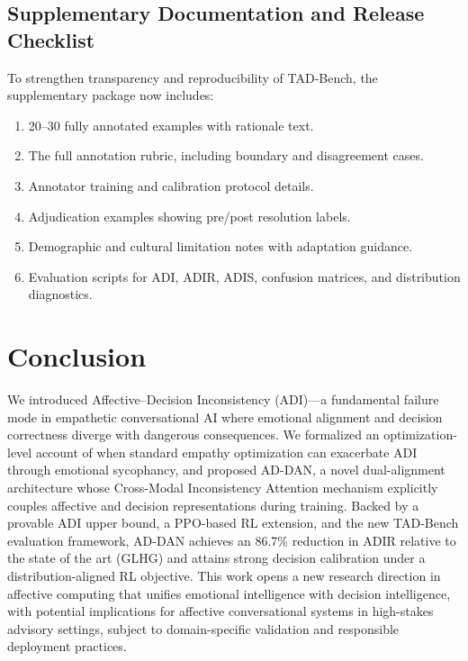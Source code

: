 \documentclass[lettersize,journal]{IEEEtran}
\begin{document}
\subsection{Supplementary Documentation and Release Checklist}
\label{sec:supplementary_checklist}

To strengthen transparency and reproducibility of TAD-Bench, the
supplementary package now includes:
\begin{enumerate}
\item 20--30 fully annotated examples with rationale text.
\item The full annotation rubric, including boundary and disagreement cases.
\item Annotator training and calibration protocol details.
\item Adjudication examples showing pre/post resolution labels.
\item Demographic and cultural limitation notes with adaptation guidance.
\item Evaluation scripts for ADI, ADIR, ADIS, confusion matrices, and
distribution diagnostics.
\end{enumerate}

\section{Conclusion}
\label{sec:conclusion}

We introduced Affective--Decision Inconsistency (ADI)—a fundamental failure
mode in empathetic conversational AI where emotional alignment and decision
correctness diverge with dangerous consequences.  We formalized an
optimization-level account of when standard empathy optimization can
exacerbate ADI through emotional sycophancy, and proposed AD-DAN, a novel
dual-alignment architecture whose
Cross-Modal Inconsistency Attention mechanism explicitly couples affective
and decision representations during training.  Backed by a provable ADI upper
bound, a PPO-based RL extension, and the new TAD-Bench evaluation framework,
AD-DAN achieves an 86.7\% reduction in ADIR relative to the state of the art
(GLHG) and attains strong decision calibration under a distribution-aligned
RL objective.  This work
opens a new research direction in affective computing that unifies emotional
intelligence with decision intelligence, with potential implications for
affective conversational systems in high-stakes advisory settings, subject
to domain-specific validation and responsible deployment practices.
\end{document}
